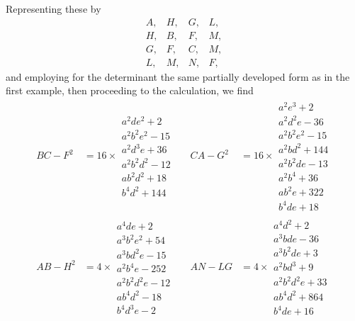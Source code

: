 \documentclass[11pt,a4paper]{article}
\theoremstyle{definition}
\begin{document}
Representing these by
\[
\begin{array}{cccc}
A, & H, & G, & L, \\
H, & B, & F, & M, \\
G, & F, & C, & M, \\
L, & M, & N, & F,
\end{array}
\]
and employing for the determinant the same partially developed form as in the first
example, then proceeding to the calculation, we find
\begin{align*}
BC - F^{2} &= 16 \times
\begin{array}{l}
a^{2}de^{2} + 2\\
a^{2}b^{2}e^{2} - 15\\
a^{2}d^{3}e + 36\\
a^{2}b^{2}d^{2} - 12\\
ab^{2}d^{2} + 18\\
b^{4}d^{2} + 144
\end{array}
&&
CA - G^{2} &= 16 \times
\begin{array}{l}
a^{2}e^{3} + 2\\
a^{2}d^{2}e - 36\\
a^{2}b^{2}e^{2} - 15\\
a^{2}bd^{2} + 144\\
a^{2}b^{2}de - 13\\
a^{2}b^{4} + 36\\
ab^{2}e + 322\\
b^{4}de + 18
\end{array}\\[2em]
AB - H^{2} &= 4 \times
\begin{array}{l}
a^{4}de + 2\\
a^{3}b^{2}e^{2} + 54\\
a^{3}bd^{2}e - 15\\
a^{2}b^{4}e - 252\\
a^{2}b^{2}d^{2}e - 12\\
ab^{4}d^{2} - 18\\
b^{4}d^{3}e - 2
\end{array}
&&
AN - LG &= 4 \times
\begin{array}{l}
a^{4}d^{2} + 2\\
a^{3}bde - 36\\
a^{3}b^{2}de + 3\\
a^{2}bd^{3} + 9\\
a^{2}b^{2}d^{2}e + 33\\
ab^{4}d^{2} + 864\\
b^{4}de + 16
\end{array}\\[2em]

\end{align*}
\end{document}
